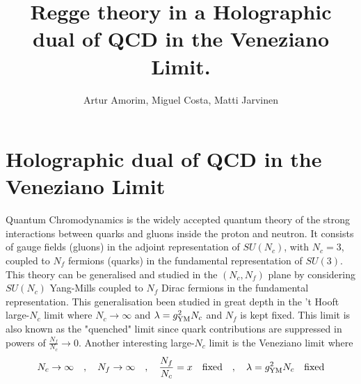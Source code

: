 \documentclass[a4paper,12pt]{article}
\title{Regge theory in a Holographic dual of QCD in the Veneziano Limit.}
\author{Artur Amorim, Miguel Costa, Matti Jarvinen}
\date{}
\begin{document}
\maketitle

\section{Holographic dual of QCD in the Veneziano Limit}

Quantum Chromodynamics is the widely accepted quantum theory of the strong interactions between quarks and gluons inside the proton and neutron. It consists of gauge fields (gluons) in the adjoint representation of $SU(N_c)$, with $N_c = 3$, coupled to $N_f$ fermions (quarks) in the fundamental representation of $SU(3)$. This theory can be generalised and studied in the $(N_c, N_f)$ plane by considering $SU(N_c)$ Yang-Mills coupled to $N_f$ Dirac fermions in the fundamental representation. This generalisation been studied in great depth in the 't Hooft large-$N_c$ limit  where $N_c \rightarrow \infty$ and $\lambda = g_{\rm{YM}}^2 N_c$ and $N_f$ is kept fixed. This limit is also known as the "quenched" limit since quark contributions are suppressed in powers of $\frac{N_f}{N_c} \rightarrow 0$.
Another interesting large-$N_c$ limit is the Veneziano limit where
\begin{align}
N_c \rightarrow \infty \quad , \quad N_f \rightarrow \infty \quad , \quad \frac{N_f}{N_c} = x \quad {\rm fixed} \quad , \quad \lambda = g_{\rm{YM}}^2 N_c \quad {\rm fixed}
\end{align}
\end{document}
